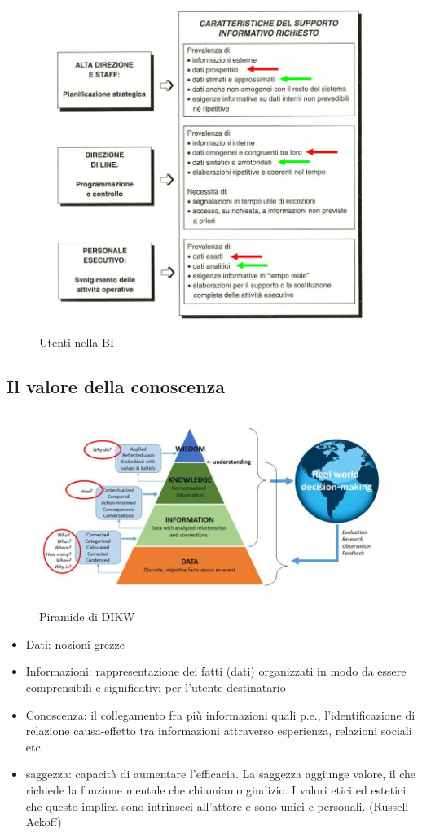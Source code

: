 \begin{figure}[H]
    \centering
    \includegraphics[width=0.4\linewidth]{imgs/2 - utenti BI}
    \label{fig:utenti_BI}
    \caption{Utenti nella BI}
\end{figure}


\subsection{Il valore della conoscenza}
\begin{figure}[H]
    \centering
    \includegraphics[width=0.6\linewidth]{imgs/3 - La piramide di DIKW}
    \label{fig:piramide_DIKW}
    \caption{Piramide di DIKW}
\end{figure}
\begin{itemize}
    \item Dati: nozioni grezze
    \item Informazioni: rappresentazione dei fatti (dati)
    organizzati in modo da essere comprensibili e
    significativi per l’utente destinatario
    \item Conoscenza: il collegamento fra più informazioni quali p.e.,
    l’identificazione di relazione causa-effetto
    tra informazioni attraverso esperienza, relazioni sociali etc.
    \item saggezza: capacità di aumentare l'efficacia. La saggezza aggiunge valore, il che
    richiede la funzione mentale che chiamiamo giudizio. I valori etici ed estetici che
    questo implica sono intrinseci all'attore e sono unici e personali. (Russell Ackoff)
\end{itemize}

